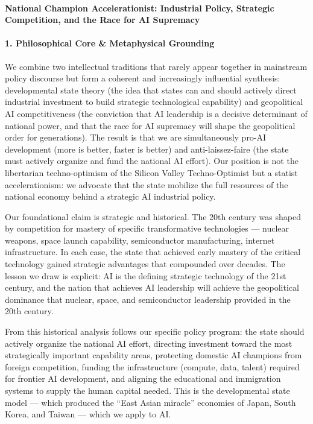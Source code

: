 \paragraph{National Champion Accelerationist: Industrial Policy,
Strategic Competition, and the Race for AI
Supremacy}\label{national-champion-accelerationist-industrial-policy-strategic-competition-and-the-race-for-ai-supremacy}

\paragraph{1. Philosophical Core \& Metaphysical
Grounding}\label{philosophical-core-metaphysical-grounding-19}

We combine two intellectual traditions that rarely appear together in
mainstream policy discourse but form a coherent and increasingly
influential synthesis: developmental state theory (the idea that states
can and should actively direct industrial investment to build strategic
technological capability) and geopolitical AI competitiveness (the
conviction that AI leadership is a decisive determinant of national
power, and that the race for AI supremacy will shape the geopolitical
order for generations). The result is that we are simultaneously pro-AI
development (more is better, faster is better) and anti-laissez-faire
(the state must actively organize and fund the national AI effort). Our
position is not the libertarian techno-optimism of the Silicon Valley
Techno-Optimist but a statist accelerationism: we advocate that the
state mobilize the full resources of the national economy behind a
strategic AI industrial policy.

Our foundational claim is strategic and historical. The 20th century was
shaped by competition for mastery of specific transformative
technologies --- nuclear weapons, space launch capability, semiconductor
manufacturing, internet infrastructure. In each case, the state that
achieved early mastery of the critical technology gained strategic
advantages that compounded over decades. The lesson we draw is explicit:
AI is the defining strategic technology of the 21st century, and the
nation that achieves AI leadership will achieve the geopolitical
dominance that nuclear, space, and semiconductor leadership provided in
the 20th century.

From this historical analysis follows our specific policy program: the
state should actively organize the national AI effort, directing
investment toward the most strategically important capability areas,
protecting domestic AI champions from foreign competition, funding the
infrastructure (compute, data, talent) required for frontier AI
development, and aligning the educational and immigration systems to
supply the human capital needed. This is the developmental state model
--- which produced the ``East Asian miracle'' economies of Japan, South
Korea, and Taiwan --- which we apply to AI.

